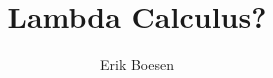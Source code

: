 \documentclass{article}
\begin{document}
\title{Lambda Calculus?}
\author{Erik Boesen}
\maketitle
\end{document}
